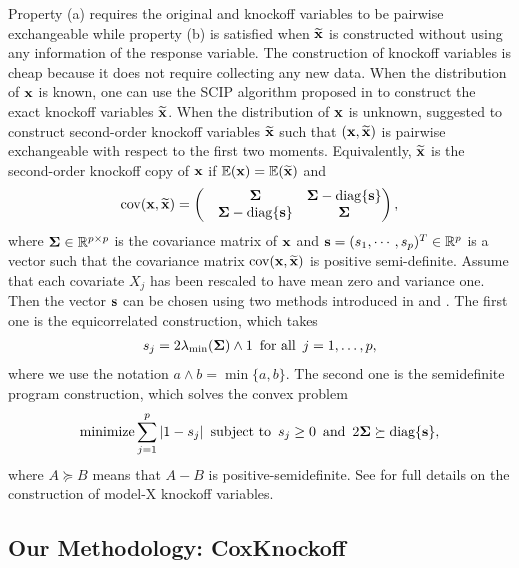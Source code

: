 \documentclass[11pt]{article}
\def\bx{{\bf x}}
\def\bs{{\bf s}}
\newcommand{\bSig}{\mbox{\boldmath $\Sigma$}}
\begin{document}
Property (a) requires
the original and knockoff variables to be pairwise exchangeable while property (b) %
is satisfied when $\widetilde{\bx}$ is constructed without using any information of the response variable. The construction of knockoff variables is cheap because it does not require collecting any
new data. When the distribution of $\bx$ is known, one can use 
the SCIP algorithm proposed in \cite{candes2018panning} to construct the exact  knockoff variables $\widetilde{\bx}$.
When the distribution of $\bx$ is unknown,  
\cite{candes2018panning} suggested  
to construct second-order knockoff variables $\widetilde{\bx}$ such that $(\bx,\widetilde{\bx})$ is pairwise exchangeable with respect to the first two moments. Equivalently, $\widetilde{\bx}$ is the second-order knockoff copy of $\bx$ if 
$\mathbb{E}(\bx)=\mathbb{E}(\widetilde{\bx})$ and 
\begin{equation}\label{eq: cov}
\mathrm{cov}(\bx,\widetilde{\bx})=
\begin{pmatrix}
&\bSig  &\bSig - {\rm{diag}}\{\bs\} \\
&\bSig - {\rm{diag}}\{\bs\} &\bSig
\end{pmatrix},
\end{equation}
where $\bSig\in \mathbb{R}^{p\times p}$ is the covariance matrix of $\bx$
and
$\bs=(s_1, \cdots, s_p)^T\in \mathbb{R}^{p} $ is a vector such that the covariance matrix $\mathrm{cov}(\bx,\widetilde{\bx})$ is positive semi-definite. 
Assume that each  covariate $X_j$ has been rescaled to have mean zero and variance one.
Then the vector $\bs$
can be chosen using two methods introduced in \cite{barber2015controlling} and \cite{candes2018panning}. The first one is the equicorrelated construction, which takes
\begin{align*}
s_j = 2\lambda_{\min}(\bSig)\wedge 1\,\,\,\mbox{for all}\,\,\,j=1, \ldots, p,
\end{align*}
where we use the notation $a \wedge b=\min\{a, b\}$. The second one is the semidefinite program construction, which solves the convex problem
\begin{align*}
\mbox{minimize}\sum_{j=1}^p|1-s_j|\,\,\,\mbox{subject to}
\,\,\,s_j\geq 0\,\,\, \mbox{and}\,\,\, 2\bSig\succeq \mbox{diag}\{\bs\},
\end{align*}
where $A\succeq B$ means that $A-B$ is positive-semidefinite.
See \cite{candes2018panning} for full details on 
the construction of model-X knockoff variables.



\subsection{Our Methodology: CoxKnockoff}
\end{document}
